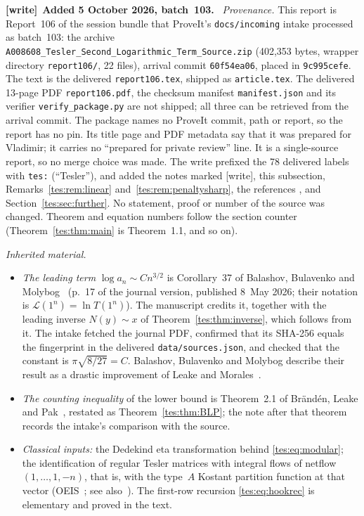 \documentclass[11pt,a4paper]{article}
\theoremstyle{remark}\newtheorem{remark}[theorem]{Remark}
\numberwithin{equation}{section}
\newenvironment{writenote}[1][]{\par\smallskip\begingroup\small
 \noindent\textbf{[write]}\if\relax\detokenize{#1}\relax\else~\textbf{#1.}\fi\ }%
 {\par\endgroup\smallskip}
\begin{document}
\begin{writenote}[Added 5 October 2026, batch~103]
\emph{Provenance.} This report is Report~106 of the session bundle that
ProveIt's \nolinkurl{docs/incoming} intake processed as batch~103: the
archive \nolinkurl{A008608_Tesler_Second_Logarithmic_Term_Source.zip}
(402{,}353 bytes, wrapper directory \nolinkurl{report106/}, 22 files),
arrival commit \nolinkurl{60f54ea06}, placed in \nolinkurl{9c995cefe}. The
text is the delivered \nolinkurl{report106.tex}, shipped as
\nolinkurl{article.tex}. The delivered 13-page PDF
\nolinkurl{report106.pdf}, the checksum manifest \nolinkurl{manifest.json}
and its verifier \nolinkurl{verify_package.py} are not shipped; all three
can be retrieved from the arrival commit. The package names no ProveIt
commit, path or report, so the report has no pin. Its title page and PDF
metadata say that it was prepared for Vladimir; it carries no ``prepared
for private review'' line. It is a single-source report, so no merge choice
was made. The write prefixed the 78 delivered labels with
\nolinkurl{tes:} (``Tesler''), and added the notes marked [write], this
subsection, Remarks~\ref{tes:rem:linear} and~\ref{tes:rem:penaltysharp},
the references \cite{oneill,mmr,aghrs,haglund}, and
Section~\ref{tes:sec:further}. No statement, proof or number of the source
was changed. Theorem and equation numbers follow the section counter
(Theorem~\ref{tes:thm:main} is Theorem~1.1, and so on).

\emph{Inherited material.}
\begin{itemize}
\item \emph{The leading term} $\log a_n\sim Cn^{3/2}$ is Corollary~37 of
 Balashov, Bulavenko and Molybog~\cite{bbm} (p.~17 of the journal version,
 published 8~May 2026; their notation is $\mathcal L(1^n)=\ln T(1^n)$).
 The manuscript credits it, together with the leading inverse
 $N(y)\sim x$ of Theorem~\ref{tes:thm:inverse}, which follows from it.
 The intake fetched the journal PDF, confirmed that its SHA-256 equals the
 fingerprint in the delivered \nolinkurl{data/sources.json}, and checked
 that the constant is $\pi\sqrt{8/27}=C$. Balashov, Bulavenko and Molybog
 describe their result as a drastic improvement of Leake and
 Morales~\cite[Theorem~1.2]{lm}.
\item \emph{The counting inequality} of the lower bound is Theorem~2.1 of
 Br\"and\'en, Leake and Pak~\cite{blp}, restated as
 Theorem~\ref{tes:thm:BLP}; the note after that theorem records the
 intake's comparison with the source.
\item \emph{Classical inputs:} the Dedekind eta transformation
 \cite[(23.18.5)]{dlmf} behind \eqref{tes:eq:modular}; the identification
 of regular Tesler matrices with integral flows of netflow
 $(1,\ldots,1,-n)$, that is, with the type~$A$ Kostant partition function
 at that vector (OEIS~\cite{oeis}; see also~\cite{mmr}). The first-row
 recursion \eqref{tes:eq:hookrec} is elementary and proved in the text.
\end{itemize}


\end{writenote}
\end{document}
